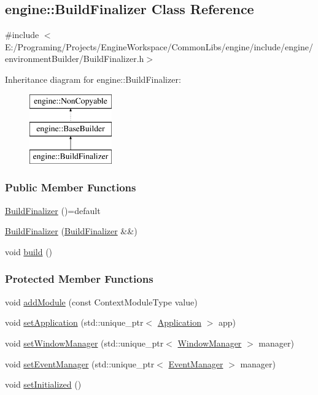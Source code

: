 \hypertarget{a00011}{}\subsection{engine\+:\+:Build\+Finalizer Class Reference}
\label{a00011}


{\ttfamily \#include $<$E\+:/\+Programing/\+Projects/\+Engine\+Workspace/\+Common\+Libs/engine/include/engine/environment\+Builder/\+Build\+Finalizer.\+h$>$}

Inheritance diagram for engine\+:\+:Build\+Finalizer\+:\begin{figure}[H]
\begin{center}
\leavevmode
\includegraphics[height=3.000000cm]{a00011}
\end{center}
\end{figure}
\subsubsection*{Public Member Functions}
\begin{DoxyCompactItemize}
\item 
\hyperlink{a00011_abb814b037e8526d18118036c5142c96a}{Build\+Finalizer} ()=default
\item 
\hyperlink{a00011_ac23ed21d3f95a3c91ecdf900387fd9c6}{Build\+Finalizer} (\hyperlink{a00011}{Build\+Finalizer} \&\&)
\item 
void \hyperlink{a00011_a1a1fa8cbc1658b9a0240845c9335ab47}{build} ()
\end{DoxyCompactItemize}
\subsubsection*{Protected Member Functions}
\begin{DoxyCompactItemize}
\item 
void \hyperlink{a00005_a52fb449fadc5d3a074e3fc7bfb56744b}{add\+Module} (const Context\+Module\+Type value)
\item 
void \hyperlink{a00005_a20c5dafa6892142bc352c13a5f3ac09a}{set\+Application} (std\+::unique\+\_\+ptr$<$ \hyperlink{a00002}{Application} $>$ app)
\item 
void \hyperlink{a00005_a641fb06484bdb07220f445f14db8c0e7}{set\+Window\+Manager} (std\+::unique\+\_\+ptr$<$ \hyperlink{a00087}{Window\+Manager} $>$ manager)
\item 
void \hyperlink{a00005_a52b490a3ef4d2a5b5b7e8e0f82d9a27c}{set\+Event\+Manager} (std\+::unique\+\_\+ptr$<$ \hyperlink{a00034}{Event\+Manager} $>$ manager)
\item 
void \hyperlink{a00005_af23e3bdfb30ca9f2076cacc9029d96c2}{set\+Initialized} ()
\end{DoxyCompactItemize}


